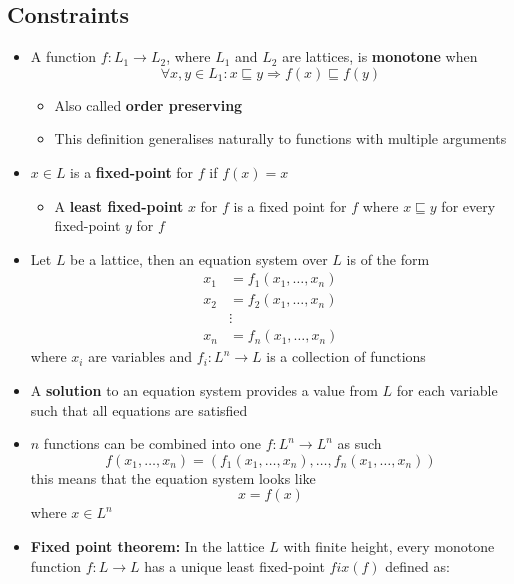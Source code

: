 \subsection{Constraints}
\begin{itemize}
  \item A function $f: L_1 \rightarrow L_2$, where $L_1$ and $L_2$ are lattices, is \textbf{monotone} when 
  \begin{equation*}
    \forall x,y \in L_1 : x \sqsubseteq y \Rightarrow f(x) \sqsubseteq f(y)
  \end{equation*}
  \begin{itemize}
  	\item Also called \textbf{order preserving} 
	  \item This definition generalises naturally to functions with multiple arguments
  \end{itemize}
  \item $x \in L$ is a \textbf{fixed-point} for $f$ if $f(x) = x$
  \begin{itemize}
	  \item A \textbf{least fixed-point} $x$ for $f$ is a fixed point for $f$ where $x \sqsubseteq y$ for every fixed-point $y$ for $f$
  \end{itemize}
  \item Let $L$ be a lattice, then an equation system over $L$ is of the form
  \begin{align*}
   x_1 &= f_1(x_1, \dots, x_n) \\ 
   x_2 &= f_2(x_1, \dots, x_n) \\ 
    & \vdots \\
   x_n &= f_n(x_1, \dots, x_n)
  \end{align*}
  where $x_i$ are variables and $f_i: L^n \rightarrow L$ is a collection of functions
	\item A \textbf{solution} to an equation system provides a value from $L$ for each variable such that all equations are satisfied
	\item $n$ functions can be combined into one $f: L^n \rightarrow L ^n$ as such
  \begin{equation*}
    f(x_1, \dots, x_n) = (f_1(x_1, \dots, x_n), \dots, f_n(x_1, \dots, x_n)) 
  \end{equation*} 
  this means that the equation system looks like
  \begin{equation*}
    x = f(x)
  \end{equation*}
  where $x \in L^n$ 
  \item \textbf{Fixed point theorem:} In the lattice $L$ with finite height, every monotone function $f: L \to L$ has a unique least fixed-point $fix(f)$ defined as:

\end{itemize}
